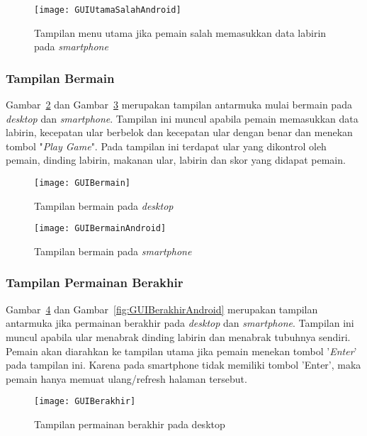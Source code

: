 \begin{figure}[H]
	\centering  
	\texttt{[image: GUIUtamaSalahAndroid]}  
	\caption[Tampilan menu utama jika pemain salah memasukkan data labirin pada \textit{smartphone}]{Tampilan menu utama jika pemain salah memasukkan data labirin pada \textit{smartphone}}
	\label{fig:GUIUtamaSalahAndroid} 
\end{figure}

\subsubsection{Tampilan Bermain}
Gambar~\ref{fig:GUIBermain} dan Gambar~\ref{fig:GUIBermainAndroid} merupakan tampilan antarmuka mulai bermain pada \textit{desktop} dan \textit{smartphone}. Tampilan ini muncul apabila pemain memasukkan data labirin, kecepatan ular berbelok dan kecepatan ular dengan benar dan menekan tombol "\textit{Play Game}". Pada tampilan ini terdapat ular yang dikontrol oleh pemain, dinding labirin, makanan ular, labirin dan skor yang didapat pemain.

\begin{figure}[H]
	\centering  
	\texttt{[image: GUIBermain]}  
	\caption[Tampilan bermain pada \textit{desktop}]{Tampilan bermain pada \textit{desktop}}
	\label{fig:GUIBermain} 
\end{figure}

\begin{figure}[H]
	\centering  
	\texttt{[image: GUIBermainAndroid]}  
	\caption[Tampilan bermain pada \textit{smartphone}]{Tampilan bermain pada \textit{smartphone}}
	\label{fig:GUIBermainAndroid} 
\end{figure}

\subsubsection{Tampilan Permainan Berakhir}
Gambar~\ref{fig:GUIBerakhir} dan Gambar~\ref{fig:GUIBerakhirAndroid} merupakan tampilan antarmuka jika permainan berakhir pada \textit{desktop} dan \textit{smartphone}. Tampilan ini muncul apabila ular menabrak dinding labirin dan menabrak tubuhnya sendiri. Pemain akan diarahkan ke tampilan utama jika pemain menekan tombol '\textit{Enter}' pada tampilan ini. Karena pada smartphone tidak memiliki tombol 'Enter', maka pemain hanya memuat ulang/refresh halaman tersebut.

\begin{figure}[H]
	\centering  
	\texttt{[image: GUIBerakhir]}  
	\caption[Tampilan permainan berakhir pada desktop]{Tampilan permainan berakhir pada desktop}
	\label{fig:GUIBerakhir} 
\end{figure}

